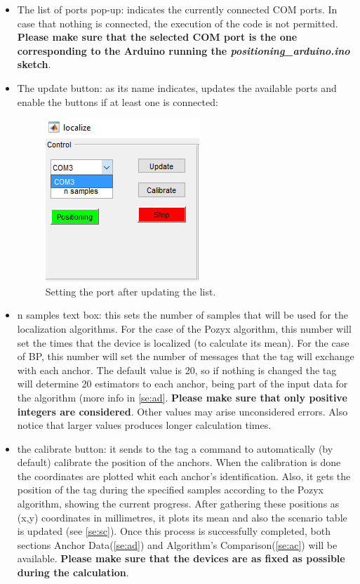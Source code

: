\documentclass[a4paper, 21pt]{article} %
\begin{document}
\begin{itemize}
\item The list of ports pop-up: indicates the currently connected COM ports. In case that nothing is connected, the execution of the code is not permitted. \textbf{Please make sure that the selected COM port is the one corresponding to the Arduino running the \textit{positioning\_arduino.ino} sketch}.
\item The update button: as its name indicates, updates the available ports and enable the buttons if at least one is connected:
\begin{figure}[H]
\begin{center}
\includegraphics[scale=.9]{fig/ss_control2.png}
\end{center}
\caption{Setting the port after updating the list.}
\end{figure}
\item n samples text box: this sets the number of samples that will be used for the localization algorithms. For the case of the Pozyx algorithm, this number will set the times that the device is localized (to calculate its mean). For the case of BP, this number will set the number of messages that the tag will exchange with each anchor. The default value is 20, so if nothing is changed the tag will determine 20 estimators to each anchor, being part of the input data for the algorithm (more info in \ref{se:ad}. \textbf{Please make sure that only positive integers are considered}. Other values may arise unconsidered errors. Also notice that larger values produces longer calculation times.
\item the calibrate button: it sends to the tag a command to automatically (by default) calibrate the position of the anchors. When the calibration is done the coordinates are plotted whit each anchor’s identification. Also, it gets the position of the tag during the specified samples according to the Pozyx algorithm, showing the current progress. After gathering these positions as (x,y) coordinates in millimetres, it plots its mean and also the scenario table is updated (see \ref{se:sc}). Once this process is successfully completed, both sections Anchor Data(\ref{se:ad}) and Algorithm's Comparison(\ref{se:ac}) will be available. \textbf{Please make sure that the devices are as fixed as possible during the calculation}.

\end{itemize}
\end{document}
